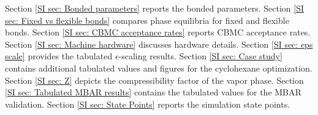 \documentclass[journal=jced,manuscript=article]{achemso}
\begin{document}
Section \ref{SI sec: Bonded parameters} reports the bonded parameters. Section \ref{SI sec: Fixed vs flexible bonds} compares phase equilibria for fixed and flexible bonds. Section \ref{SI sec: CBMC acceptance rates} reports CBMC acceptance rates. Section \ref{SI sec: Machine hardware} discusses hardware details. Section \ref{SI sec: eps scale} provides the tabulated $\epsilon$-scaling results. Section \ref{SI sec: Case study} contains additional tabulated values and figures for the cyclohexane optimization. Section \ref{SI sec: Z} depicts the compressibility factor of the vapor phase. Section \ref{SI sec: Tabulated MBAR results} contains the tabulated values for the MBAR validation. Section \ref{SI sec: State Points} reports the simulation state points.



%
%
%
%
%
%
\end{document}
